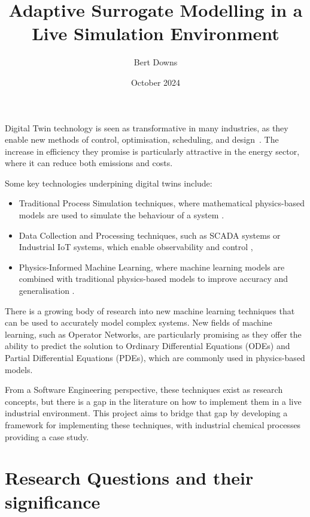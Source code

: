 \documentclass[12pt]{article}
\title{Adaptive Surrogate Modelling in a Live Simulation Environment}
\author{Bert Downs }
\date{October 2024}
\begin{document}
\maketitle

Digital Twin technology is seen as transformative in many industries, as they enable new methods of control, optimisation, scheduling, and design~\cite{walmsley2024adaptive}. The increase in efficiency they promise is particularly attractive in the energy sector, where it can reduce both emissions and costs.

Some key technologies underpining digital twins include:

\begin{itemize}
    \item Traditional Process Simulation techniques, where mathematical physics-based models are used to simulate the behaviour of a system \cite{lee2021idaes}.
    \item Data Collection and Processing techniques, such as SCADA systems or Industrial IoT systems, which enable observability and control \cite{udugama2020role},
    \item Physics-Informed Machine Learning, where machine learning models are combined with traditional physics-based models to improve accuracy and generalisation \cite{karniadakis2021physics}.
\end{itemize}

There is a growing body of research into new machine learning techniques that can be used to accurately model complex systems. New fields of machine learning, such as Operator Networks, are particularly promising as they offer the ability to predict the solution to Ordinary Differential Equations (ODEs) and Partial Differential Equations (PDEs)\cite{lu2019deeponet}, which are commonly used in physics-based models.

From a Software Engineering perspective, these techniques exist as research concepts, but there is a gap in the literature on how to implement them in a live industrial environment. This project aims to bridge that gap by developing a framework for implementing these techniques, with industrial chemical processes providing a case study.

\section{Research Questions and their significance}

\end{document}
